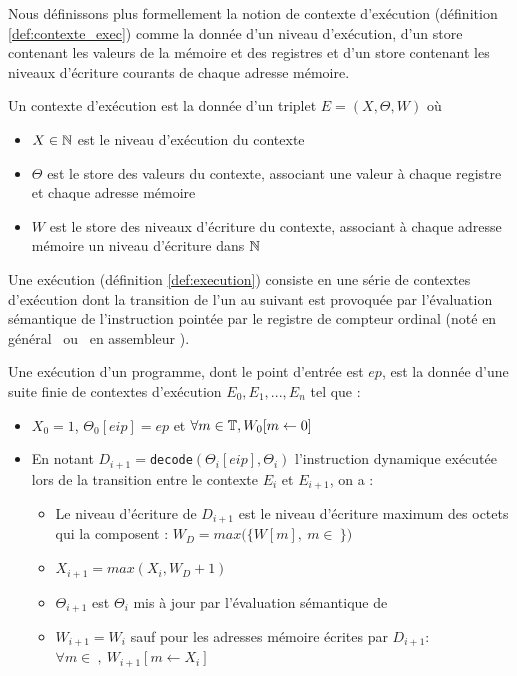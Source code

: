 
Nous définissons plus formellement la notion de contexte d'exécution (définition \ref{def:contexte_exec}) comme la donnée d'un niveau d'exécution, d'un store contenant les valeurs de la mémoire et des registres et d'un store contenant les niveaux d'écriture courants de chaque adresse mémoire.

\begin{defi}
Un contexte d'exécution est la donnée d'un triplet $E=(X, \Theta, W)$ où
\begin{itemize}
 \item $X\in\mathbb N$ est le niveau d'exécution du contexte
 \item $\Theta$ est le store des valeurs du contexte, associant une valeur à chaque registre et chaque adresse mémoire
 \item $W$ est le store des niveaux d'écriture du contexte, associant à chaque adresse mémoire un niveau d'écriture dans $\mathbb N$
\end{itemize}
\label{def:contexte_exec}
\end{defi}

Une exécution (définition \ref{def:execution}) consiste en une série de contextes d'exécution dont la transition de l'un au suivant est provoquée par l'évaluation sémantique de l'instruction pointée par le registre de compteur ordinal (noté en général \pc\ ou \eip\ en assembleur \xq). 

\begin{defi}
Une exécution d'un programme, dont le point d'entrée est $ep$, est la donnée d'une suite finie de contextes d'exécution $E_0, E_1, ..., E_n$ tel que :
\begin{itemize}
 \item $X_0=1$, $\Theta_0[eip]=ep$ et $\forall m\in \mathbb T, W_0[m\leftarrow 0]$
 \item En notant $D_{i+1}=$\texttt{decode}$(\Theta_i[eip], \Theta_i)$ l'instruction dynamique exécutée lors de la transition entre le contexte $E_i$ et $E_{i+1}$, on a :
    \begin{itemize}
     \item Le niveau d'écriture de $D_{i+1}$ est le niveau d'écriture maximum des octets qui la composent : $W_D=max(\{W[m],\ m\in\ $$\})$
     \item $X_{i+1}=max(X_i, W_D+1)$
     \item $\Theta_{i+1}$ est $\Theta_i$ mis à jour par l'évaluation sémantique de 
     \item $W_{i+1}=W_{i}$ sauf pour les adresses mémoire écrites par $D_{i+1}$:\\ $\forall m\in\ $$,\ W_{i+1}[m\leftarrow X_i]$
    \end{itemize}
\end{itemize}
\label{def:execution}
\end{defi}

